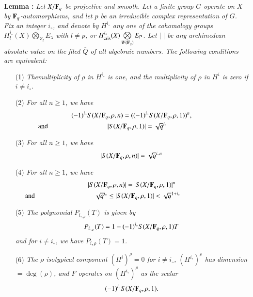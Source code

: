 \medskip
\noindent
{\bfseries Lemma :\label{art6-lem1.1}}
\textit{Let $X/\mathbf{F}_q$ be projective and smooth. Let a finite group $G$ operate on $X$ by $\mathbf{F}_q$-automorphisms, and let $p$ be an irreducible complex representation of $G$. Fix an integer $i_\circ$, and denote by $H^{i_\circ}$ any one of the cohomology groups $H^{i_\circ}_l(X) \bigotimes_{Z_l} E_\lambda$ with $l \neq p$, or $H^{i_\circ}_{\text{cris}}(X) \bigotimes\limits_{W(\mathbf{F}_q)} E_{\mathsf{P}}$. Let $|\;|$ be any archimedean absolute value on the filed $\bar{Q}$ of all algebraic numbers. The following conditions are equivalent:}
\begin{enumerate}
\item[(1)] \textit{The\pageoriginale multiplicity of $\rho$ in $H^{i_\circ}$ is one, and the multiplicity of $\rho$ in $H^i$ is zero if $i \neq i_\circ$.}

\item[(2)] \textit{For all $n \geq 1$, we have }
\begin{gather*}
(-1)^{i_\circ} S (X / \bF_q, \rho,n) = ((-1)^{i_\circ} S (X / \bF_q, \rho, 1))^n,\\
\text{and } \hspace{3cm}|S (X / \bF_q, \rho, 1)| = \sqrt{q}^{i_\circ} \hspace{3cm}
\end{gather*}

\item[(3)] \textit{For all $n \geq 1$, we have}
$$
|S(X/ \mathbf{F}_q, \rho, n)| = \sqrt{q}^{i_\circ n}
$$

\item[(4)] \textit{For all $n \geq 1$, we have }
\begin{gather*}
|S (X/ \bF_q, \rho, n)| = |S(X/ \bF_q,  \rho, 1)|^n\\
\text{and } \hspace{3cm} \sqrt{q}^{i_\circ} \leq |S (X / \bF_q, \rho, 1)| < \sqrt{q}^{1+ i_\circ}\hspace{3cm}
\end{gather*}

\item[(5)] \textit{The polynomial $P_{i_{\circ, \rho}} (T)$ is given by}
$$
P_{i_{\circ, \rho}} (T) = 1 - (-1)^{i_\circ} S (X / \mathbf{F}_q, \rho, 1) T 
$$
\textit{and for $i \neq i_\circ$, we have $P_{i,\rho} (T) =1$.}

\item[(6)] \textit{The $\rho$-isotypical component $(H^i)^\rho =0$ for $i \neq i_\circ$, $(H^{i_\circ})^\rho$ has dimension $ = \deg (\rho)$, and $F$ operates on $(H^{i_\circ})^\rho$ as the scalar 
$$
(-1)^{i_\circ} S (X/ \mathbf{F}_q, \rho, 1).
$$}
\end{enumerate}

